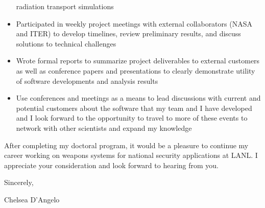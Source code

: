 \begin{center}
\begin{minipage}{\textwidth}
\begin{itemize}[leftmargin=.875in,rightmargin=.875in,itemsep=1.0mm]
		       radiation transport simulations
                \item Participated in weekly project meetings with external collaborators (NASA and
	              ITER) to develop timelines, review preliminary results, and discuss
		      solutions to technical challenges
		\item Wrote formal reports to summarize project
			deliverables to external customers as well as conference
			papers and presentations to clearly demonstrate
			utility of software
			developments and analysis results
	       \item Use conferences and meetings as a means to lead
		       discussions with current and potential customers about
		       the software that my team and I have developed and I look forward to the opportunity to travel to
		       more of these events to network with other
			scientists and expand my knowledge
		       


\end{itemize} 

\vspace{5mm} %


\vspace{1.5mm}

After completing my doctoral program, it would be a pleasure 
to continue my career working on weapons systems for
national security applications at LANL.  
I appreciate your consideration and look forward to hearing from you. 
  \vspace{6mm}
  
  Sincerely, \\ \vspace{-4mm}
  
  
  Chelsea D'Angelo
  
  \endgroup
  
  \end{minipage}
\end{center}
